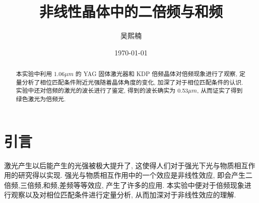 \documentclass[aps,pre,12pt,preprint,%
	onecolumn,showpacs,showkeys,nofootinbib]{revtex4-2}
\begin{document}
	\title{%
	\texstringonly{\hfil\\[2\baselineskip]}
	\sf\LARGE%
		非线性晶体中的二倍频与和频%
	\texstringonly{\vspace{3ex}}}
	\author{\fangsong\large%
		吴熙楠%
	\vspace{2mm}}
	\date{\today}
	
\begin{abstract}
\vspace{10mm}
\begin{spacing}{1.5}\normalsize
\setlength{\parskip}{.3\baselineskip}
%	
本实验中利用 1.06$\mu m$ 的 YAG 固体激光器和 KDP 倍频晶体对倍频现象进行了观察, 定量分析了相位匹配条件附近光强随着晶体角度的变化, 加深了对于相位匹配条件的认识. 实验中还对倍频的激光的波长进行了鉴定, 得到的波长确实为 0.53$\mu m$, 从而证实了得到绿色激光为倍频光.
\end{spacing}
\end{abstract}
\clearpage
\maketitle
\thispagestyle{titlepagestyle}
%

\newpage
\section{引言}
激光产生以后能产生的光强被极大提升了, 这使得人们对于强光下光与物质相互作用的研究得以实现. 强光与物质相互作用中的一个效应是非线性效应, 即会产生二倍频,三倍频,和频,差频等等效应, 产生了许多的应用. 本实验中便对于倍频现象进行观察以及对相位匹配条件进行定量分析, 从而加深对于非线性效应的理解.
\end{document}
